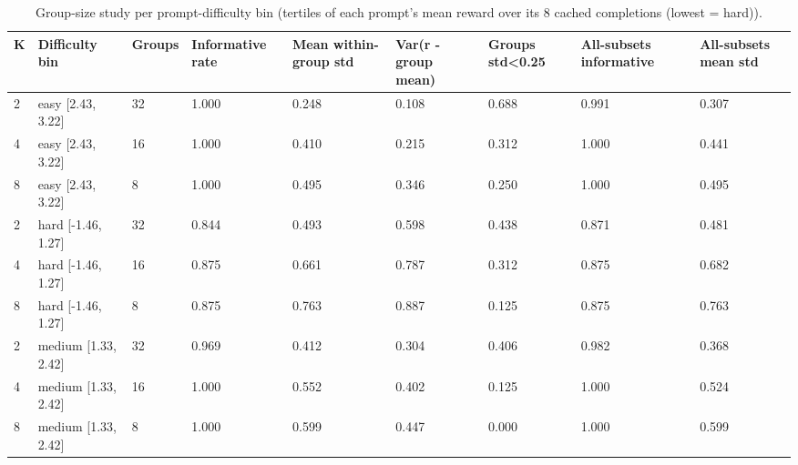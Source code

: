 \begin{table}[t]
\centering
\small
\caption{Group-size study per prompt-difficulty bin (tertiles of each prompt's mean reward over its 8 cached completions (lowest = hard)).}
\begin{tabular}{lllllllll}
\toprule
K & Difficulty bin & Groups & Informative rate & Mean within-group std & Var(r - group mean) & Groups std<0.25 & All-subsets informative & All-subsets mean std \\
\midrule
2 & easy [2.43, 3.22] & 32 & 1.000 & 0.248 & 0.108 & 0.688 & 0.991 & 0.307 \\
4 & easy [2.43, 3.22] & 16 & 1.000 & 0.410 & 0.215 & 0.312 & 1.000 & 0.441 \\
8 & easy [2.43, 3.22] & 8 & 1.000 & 0.495 & 0.346 & 0.250 & 1.000 & 0.495 \\
2 & hard [-1.46, 1.27] & 32 & 0.844 & 0.493 & 0.598 & 0.438 & 0.871 & 0.481 \\
4 & hard [-1.46, 1.27] & 16 & 0.875 & 0.661 & 0.787 & 0.312 & 0.875 & 0.682 \\
8 & hard [-1.46, 1.27] & 8 & 0.875 & 0.763 & 0.887 & 0.125 & 0.875 & 0.763 \\
2 & medium [1.33, 2.42] & 32 & 0.969 & 0.412 & 0.304 & 0.406 & 0.982 & 0.368 \\
4 & medium [1.33, 2.42] & 16 & 1.000 & 0.552 & 0.402 & 0.125 & 1.000 & 0.524 \\
8 & medium [1.33, 2.42] & 8 & 1.000 & 0.599 & 0.447 & 0.000 & 1.000 & 0.599 \\
\bottomrule
\end{tabular}
\end{table}
